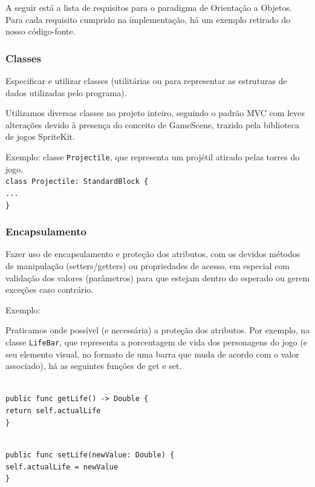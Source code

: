 \documentclass[rel_mlp]{iiufrgs}
\newcommand\tab[1][1cm]{\hspace*{#1}}
\begin{document}
A seguir está a lista de requisitos para o paradigma de Orientação a Objetos. Para cada requisito cumprido na implementação, há um exemplo retirado do nosso código-fonte.

\subsubsection{Classes}

Especificar e utilizar classes (utilitárias ou para representar as estruturas de dados utilizadas pelo programa).

Utilizamos diversas classes no projeto inteiro, seguindo o padrão MVC com leves alterações devido à presença do conceito de GameScene, trazido pela biblioteca de jogos SpriteKit.

Exemplo: classe \texttt{Projectile}, que representa um projétil atirado pelas torres do jogo.
\texttt{\\class Projectile: StandardBlock \{\\\tab ...\\\}}


\subsubsection{Encapsulamento}

Fazer uso de encapsulamento e proteção dos atributos, com os devidos métodos de manipulação (setters/getters) ou propriedades de acesso, em especial com validação dos valores (parâmetros) para que estejam dentro do esperado ou gerem exceções caso contrário.

Exemplo:

Praticamos onde possível (e necessária) a proteção dos atributos. Por exemplo, na classe \texttt{LifeBar}, que representa a porcentagem de vida dos personagens do jogo (e seu elemento visual, no formato de uma barra que muda de acordo com o valor associado), há as seguintes funções de get e set.

\texttt{\\public func getLife() -> Double \{\\\tab return self.actualLife\\\}}

\texttt{\\public func setLife(newValue: Double) \{\\\tab self.actualLife = newValue\\\}}
    
\end{document}
